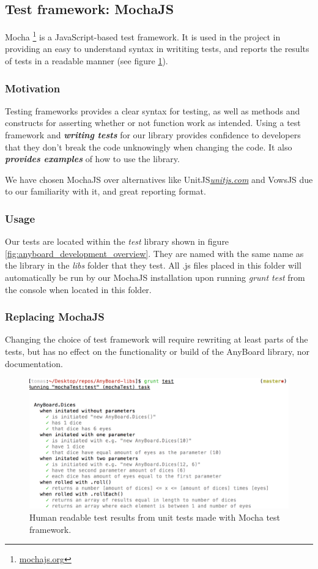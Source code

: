 \subsection{Test framework: MochaJS}
Mocha \footnote{\href{http://mochajs.org/}{mochajs.org}} is a JavaScript-based test framework. It is used in the project in providing an easy to understand syntax in writiting tests, and reports the results of tests in a readable manner (see figure \ref{fig:mocha_result}). 

\subsubsection{Motivation}
Testing frameworks provides a clear syntax for testing, as well as methods and constructs for asserting whether or not function work as intended. Using a test framework and \emph{\textbf{writing tests}} for our library provides confidence to developers that they don't break the code unknowingly when changing the code. It also \emph{\textbf{provides examples}} of how to use the library.

We have chosen MochaJS over alternatives like UnitJS\emph{\href{http://unitjs.com/}{unitjs.com}} and VowsJS due to our familiarity with it, and great reporting format.

\subsubsection{Usage}
Our tests are located within the \emph{test} library shown in figure \ref{fig:anyboard_development_overview}. They are named with the same name as the library in the \emph{libs} folder that they test. All .js files placed in this folder will automatically be run by our MochaJS installation upon running \emph{grunt test} from the console when located in this folder.

\subsubsection{Replacing MochaJS}
Changing the choice of test framework will require rewriting at least parts of the tests, but has no effect on the functionality or build of the AnyBoard library, nor documentation.

\begin{figure}[ht]
\includegraphics[width=12cm]{img/mocha-result}
\centering
\caption{Human readable test results from unit tests made with Mocha test framework.}
\label{fig:mocha_result}
\end{figure}

